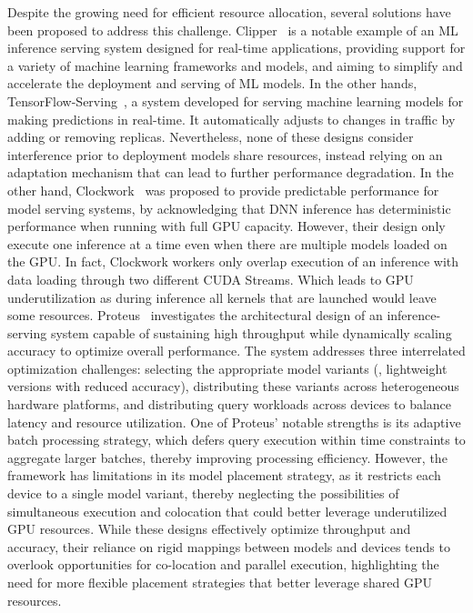 Despite the growing need for efficient resource allocation, several solutions have been proposed to address this challenge. Clipper~\cite{2017Clipper} is a notable example of an ML inference serving system designed for real-time applications, providing support for a variety of machine learning frameworks and models, and aiming to simplify and accelerate the deployment and serving of ML models. In the other hands, TensorFlow-Serving~\cite{olston2017tensorflow}, a system developed for serving machine learning models for making predictions in real-time. It automatically adjusts to changes in traffic by adding or removing replicas. Nevertheless, none of these designs consider interference prior to deployment models share resources, instead relying on an adaptation mechanism that can lead to further performance degradation. In the other hand, Clockwork~\cite{gujarati2020servingDNNlikeclockwork} was proposed to provide predictable performance for model serving systems, by acknowledging that DNN inference has deterministic performance when running with full GPU capacity. However, their design only execute one inference at a time even when there are multiple models loaded on the GPU. In fact, Clockwork workers only overlap execution of an inference with data loading through two different CUDA Streams. Which leads to GPU underutilization as during inference all kernels that are launched would leave some resources. Proteus~\cite{ahmad2024proteus} investigates the architectural design of an inference-serving system capable of sustaining high throughput while dynamically scaling accuracy to optimize overall performance. The system addresses three interrelated optimization challenges: selecting the appropriate model variants (\eg, lightweight versions with reduced accuracy), distributing these variants across heterogeneous hardware platforms, and distributing query workloads across devices to balance latency and resource utilization. One of Proteus' notable strengths is its adaptive batch processing strategy, which defers query execution within time constraints to aggregate larger batches, thereby improving processing efficiency. However, the framework has limitations in its model placement strategy, as it restricts each device to a single model variant, thereby neglecting the possibilities of simultaneous execution and colocation that could better leverage underutilized GPU resources.
While these designs effectively optimize throughput and accuracy, their reliance on rigid mappings between models and devices tends to overlook opportunities for co-location and parallel execution, highlighting the need for more flexible placement strategies that better leverage shared GPU resources.


